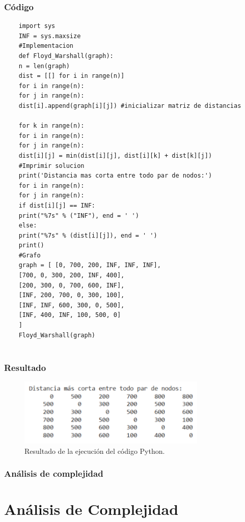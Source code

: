 \subsubsection{Código}
\begin{lstlisting}
	import sys
	INF = sys.maxsize
	#Implementacion
	def Floyd_Warshall(graph):
	n = len(graph)
	dist = [[] for i in range(n)]
	for i in range(n):
	for j in range(n):
	dist[i].append(graph[i][j]) #inicializar matriz de distancias
	
	for k in range(n):
	for i in range(n):
	for j in range(n):
	dist[i][j] = min(dist[i][j], dist[i][k] + dist[k][j])
	#Imprimir solucion
	print('Distancia mas corta entre todo par de nodos:')
	for i in range(n):
	for j in range(n):
	if dist[i][j] == INF:
	print("%7s" % ("INF"), end = ' ')
	else:
	print("%7s" % (dist[i][j]), end = ' ')
	print()
	#Grafo
	graph = [ [0, 700, 200, INF, INF, INF],
	[700, 0, 300, 200, INF, 400],
	[200, 300, 0, 700, 600, INF],
	[INF, 200, 700, 0, 300, 100],
	[INF, INF, 600, 300, 0, 500],
	[INF, 400, INF, 100, 500, 0]
	]
	Floyd_Warshall(graph)
	
\end{lstlisting}

\subsubsection{Resultado}
\begin{figure}[H]
	\centering
	\includegraphics[width=0.8\textwidth]{resultado_distancias_ejem1.png}
	\caption{Resultado de la ejecución del código Python.}
	\label{fig:resultado3}
\end{figure}

\subsubsection{Análisis de complejidad}

\section*{Análisis de Complejidad}

